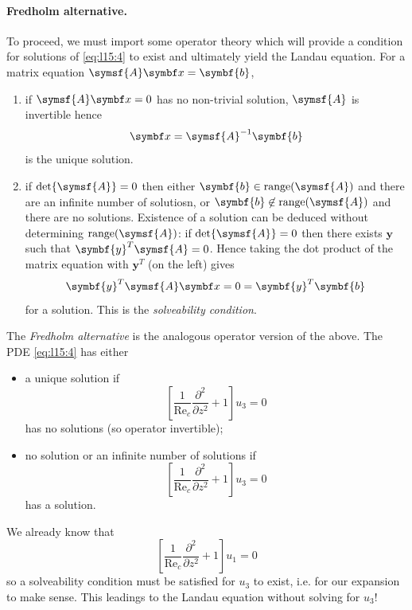 \documentclass{jknotes}
\newcommand{\ReN}{\text{Re}}
\begin{document}
\paragraph{Fredholm alternative.} To proceed, we must import some operator
theory which will provide a condition for solutions of \eqref{eq:l15:4} to
exist and ultimately yield the Landau equation. For a matrix equation
$\symsf{A}\x = \symbf{b}$,
\begin{enumerate}
	\item if $\symsf{A}\x = 0$ has no non-trivial solution, $\symsf{A}$ is
		invertible hence
		\begin{equation}
			\x = \symsf{A}^{-1}\symbf{b}
		\end{equation}
		is the unique solution.
	\item if $\det \symsf{A} = 0$ then either $\symbf{b} \in
		\mathrm{range}(\symsf{A})$ and there are an infinite number of
		solutiosn, or $\symbf{b} \not\in \mathrm{range}(\symsf{A})$ and there
		are no solutions. Existence of a solution can be deduced without
		determining $\mathrm{range}(\symsf{A})$: if $\det \symsf{A} = 0$ then
		there exists $\symbf{y}$ such that $\symbf{y}^T \symsf{A} = 0$. Hence
		taking the dot product of the matrix equation with $\symbf{y}^T$ (on
		the left) gives
		\begin{equation}
			\symbf{y}^T\symsf{A}\x = 0 =  \symbf{y}^T \symbf{b}
		\end{equation}
		for a solution. This is the \emph{solveability condition}.
\end{enumerate}
The \emph{Fredholm alternative} is the analogous operator version of the
above. The PDE \eqref{eq:l15:4} has either
\begin{itemize}
	\item a unique solution if
		\begin{equation}
			\left[\frac{1}{\ReN_c}\frac{\partial^2}{\partial z^2} + 1\right]
			u_3 = 0
		\end{equation}
		has no solutions (so operator invertible);
	\item no solution or an infinite number of solutions if
		\begin{equation}
			\left[\frac{1}{\ReN_c}\frac{\partial^2}{\partial z^2} + 1\right]
			u_3 = 0
		\end{equation}
		has a solution.
\end{itemize}
We already know that
\begin{equation}
	\left[\frac{1}{\ReN_c}\frac{\partial^2}{\partial z^2} + 1\right]
	u_1 = 0
\end{equation}
so a solveability condition must be satisfied for $u_3$ to exist, i.e. for our
expansion to make sense. This leadings to the Landau equation without solving
for $u_3$! 
\end{document}
